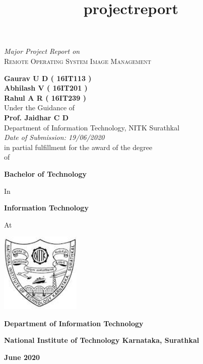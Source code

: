 \documentclass[a4paper,12pt]{article}
\title{projectreport}
\begin{document}
\thispagestyle{empty}
\begin{center}
\textit{Major Project Report on} \\
\vspace{2 mm}
\Large{\textsc{ Remote Operating System Image Management }}   %

\vspace{7 mm}
\large{\textbf{                  %
Gaurav U D ( 16IT113 )  
\\Abhilash V ( 16IT201 )   
\\Rahul A R ( 16IT239 ) 
}}
\\
\vspace{4 mm}
Under the Guidance of\\
\textbf{Prof. Jaidhar C D}\\         %
Department of Information Technology, NITK Surathkal\\
\vspace{4 mm}
\textit{Date of Submission: 19/06/2020}
\\
\vspace{4 mm}
in partial fulfillment for the award of the degree
\\

of

\textbf{Bachelor of Technology}

In

\textbf{Information Technology}

At
\vspace{4 mm}
    
        \includegraphics[width=1.5in,height=1.5in]
        {nitk.jpg}
 
\textbf{Department of Information Technology}

\textbf{National Institute of Technology Karnataka, Surathkal}

\textbf{June 2020}
\end{center}

\end{document}

